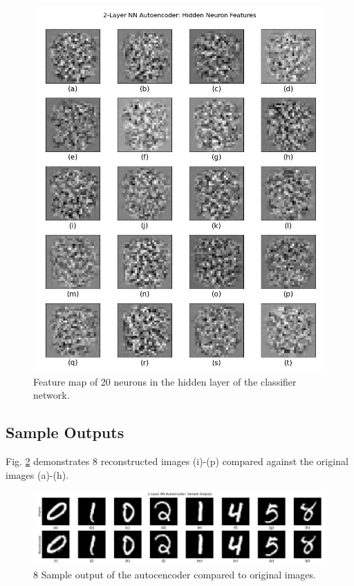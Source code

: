 \documentclass[11pt,titlepage]{article}
\begin{document}
\begin{figure}[htb]
\begin{minipage}{0.45\linewidth}
		\includegraphics[width=\linewidth]{img/h3p2_feature}
		\caption{Feature map of 20 neurons in the hidden layer of the classifier network.}
		\label{fig:autoenc_feature}
	\end{minipage}

\end{figure}

\subsection{Sample Outputs}

Fig. \ref{fig:autoenc_output} demonstrates 8 reconstructed images (i)-(p) compared against the original images (a)-(h).

\begin{figure}[htb]
	\centering
	\includegraphics[width=\linewidth]{img/h3p2_outputs}
	\caption{8 Sample output of the autocencoder compared to original images.}
	\label{fig:autoenc_output}
\end{figure}
\end{document}
